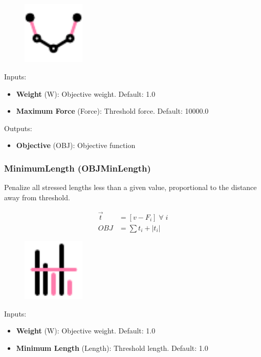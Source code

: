 \begin{figure}[h]
    \centering
    \includegraphics*[width = 3cm]{Figures/maxforce}
\end{figure}

Inputs:
\begin{itemize}
    \setlength\itemsep{0.05em}
    \item \textbf{Weight} (W): Objective weight. {\color{gray} Default: 1.0}
    \item \textbf{Maximum Force} (Force): Threshold force. {\color{gray} Default: 10000.0}
\end{itemize}

Outputs:
\begin{itemize}
    \setlength\itemsep{0.05em}
    \item \textbf{Objective} (OBJ): Objective function
\end{itemize}

\subsubsection{MinimumLength (OBJMinLength)} \label{OBJMinLength}
Penalize all stressed lengths less than a given value, proportional to the distance away from threshold.

\begin{align*}
    \vec{t} &= \left[v - F_i\right] \; \forall \; i\\
    OBJ &= \sum t_i + |t_i|
\end{align*}

\begin{figure}[h]
    \centering
    \includegraphics*[width = 3cm]{Figures/minlength}
\end{figure}

Inputs:
\begin{itemize}
    \setlength\itemsep{0.05em}
    \item \textbf{Weight} (W): Objective weight. {\color{gray} Default: 1.0}
    \item \textbf{Minimum Length} (Length): Threshold length. {\color{gray} Default: 1.0}
\end{itemize}

